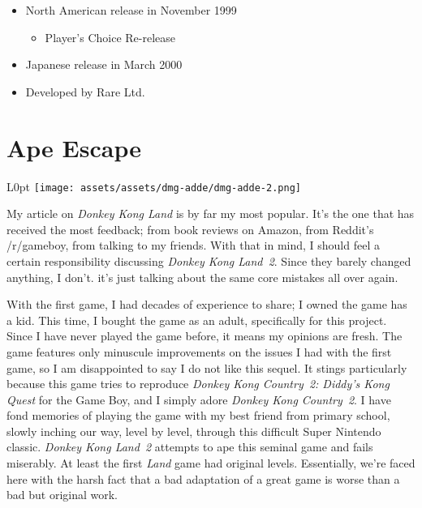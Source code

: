 \documentclass{book}
\begin{document}
\begin{itemize} [nosep]
\item North American release in November 1999
\begin{itemize} [nosep]\item Player’s Choice Re-release\end{itemize}\noindent






\item Japanese release in March 2000
































\item Developed by Rare Ltd.

\end{itemize}\noindent

\newpage\FloatBarrier\needspace{10mm}\section*{Ape Escape}\nopagebreak[4]
\begin{wrapfigure}{L}{0pt} \texttt{[image: assets/assets/dmg-adde/dmg-adde-2.png]}\end{wrapfigure}
My article on \emph{Donkey Kong Land} is by far my most popular. It’s the one that has received the most feedback; from book reviews on Amazon, from Reddit’s /r/gameboy, from talking to my friends. With that in mind, I should feel a certain responsibility discussing \emph{Donkey Kong Land 2}. Since they barely changed anything, I don’t. it’s just talking about the same core mistakes all over again.

With the first game, I had decades of experience to share; I owned the game has a kid. This time, I bought the game as an adult, specifically for this project. Since I have never played the game before, it means my opinions are fresh. The game features only minuscule improvements on the issues I had with the first game, so I am disappointed to say I do not like this sequel. It stings particularly because this game tries to reproduce \emph{Donkey Kong Country 2: Diddy’s Kong Quest} for the Game Boy, and I simply adore \emph{Donkey Kong Country 2}. I have fond memories of playing the game with my best friend from primary school, slowly inching our way, level by level, through this difficult Super Nintendo classic. \emph{Donkey Kong Land 2} attempts to ape this seminal game and fails miserably. At least the first \emph{Land} game had original levels. Essentially, we’re faced here with the harsh fact that a bad adaptation of a great game is worse than a bad but original work.
\end{document}

